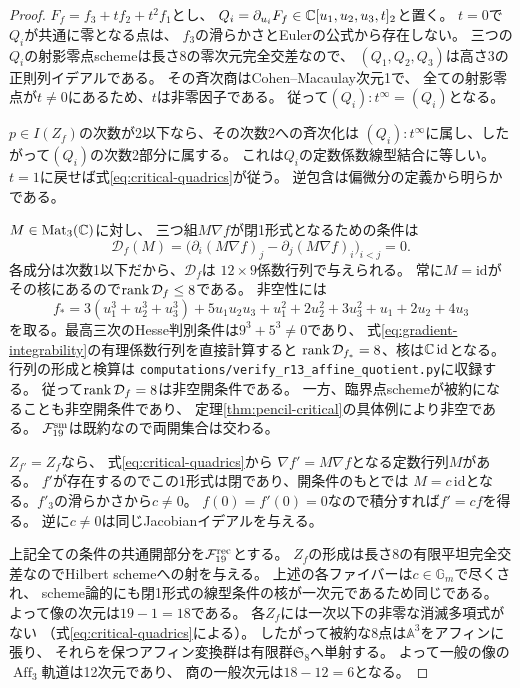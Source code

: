 \begin{proof}
$F_f=f_3+t f_2+t^2f_1$とし、
$Q_i=\partial_{u_i}F_f\in\mathbb C[u_1,u_2,u_3,t]_2$と置く。
$t=0$で$Q_i$が共通に零となる点は、
$f_3$の滑らかさとEulerの公式から存在しない。
三つの$Q_i$の射影零点schemeは長さ8の零次元完全交差なので、
$(Q_1,Q_2,Q_3)$は高さ3の正則列イデアルである。
その斉次商はCohen--Macaulay次元1で、
全ての射影零点が$t\ne0$にあるため、$t$は非零因子である。
従って$(Q_i):t^\infty=(Q_i)$となる。

$p\in I(Z_f)$の次数が2以下なら、その次数2への斉次化は
$(Q_i):t^\infty$に属し、したがって$(Q_i)$の次数2部分に属する。
これは$Q_i$の定数係数線型結合に等しい。
$t=1$に戻せば式\eqref{eq:critical-quadrics}が従う。
逆包含は偏微分の定義から明らかである。

$M\in\operatorname{Mat}_3(\mathbb C)$に対し、
三つ組$M\nabla f$が閉1形式となるための条件は
\begin{equation}\label{eq:gradient-integrability}
 \mathcal D_f(M)=
 \bigl(\partial_i(M\nabla f)_j-
       \partial_j(M\nabla f)_i\bigr)_{i<j}=0.
\end{equation}
各成分は次数1以下だから、$\mathcal D_f$は
$12\times9$係数行列で与えられる。
常に$M=\mathrm{id}$がその核にあるので$\operatorname{rank}\mathcal D_f\le8$である。
非空性には
\[
 f_*=3(u_1^3+u_2^3+u_3^3)+5u_1u_2u_3
       +u_1^2+2u_2^2+3u_3^2+u_1+2u_2+4u_3
\]
を取る。最高三次のHesse判別条件は$9^3+5^3\ne0$であり、
式\eqref{eq:gradient-integrability}の有理係数行列を直接計算すると
$\operatorname{rank}\mathcal D_{f_*}=8$、核は$\mathbb C\,\mathrm{id}$となる。
行列の形成と検算は
\texttt{computations/verify\_r13\_affine\_quotient.py}に収録する。
従って$\operatorname{rank}\mathcal D_f=8$は非空開条件である。
一方、臨界点schemeが被約になることも非空開条件であり、
定理\ref{thm:pencil-critical}の具体例により非空である。
$\mathcal F_{19}^{\rm sm}$は既約なので両開集合は交わる。

$Z_{f'}=Z_f$なら、
式\eqref{eq:critical-quadrics}から
$\nabla f'=M\nabla f$となる定数行列$M$がある。
$f'$が存在するのでこの1形式は閉であり、開条件のもとでは
$M=c\,\mathrm{id}$となる。$f'_3$の滑らかさから$c\ne0$。
$f(0)=f'(0)=0$なので積分すれば$f'=cf$を得る。
逆に$c\ne0$は同じJacobianイデアルを与える。

上記全ての条件の共通開部分を$\mathcal F_{19}^{\rm rec}$とする。
$Z_f$の形成は長さ8の有限平坦完全交差なのでHilbert schemeへの射を与える。
上述の各ファイバーは$c\in\mathbb G_m$で尽くされ、
scheme論的にも閉1形式の線型条件の核が一次元であるため同じである。
よって像の次元は$19-1=18$である。
各$Z_f$には一次以下の非零な消滅多項式がない
（式\eqref{eq:critical-quadrics}による）。
したがって被約な8点は$\mathbb A^3$をアフィンに張り、
それらを保つアフィン変換群は有限群$\mathfrak S_8$へ単射する。
よって一般の像の$\operatorname{Aff}_3$軌道は12次元であり、
商の一般次元は$18-12=6$となる。
\end{proof}

